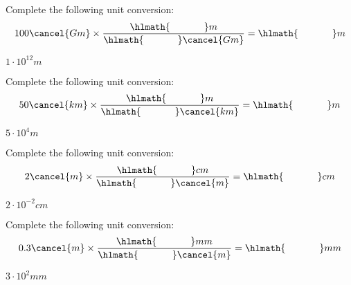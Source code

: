 \documentclass[main.tex]{subfiles}
\begin{document}
\begin{multicols*}{2}
\begin{question}[ID=17]
Complete the following unit conversion:
\[100\cancel{ Gm} \times \dfrac{ \hlmath{\hspace{35pt}}  m}{\hlmath{\hspace{35pt}} \cancel{ Gm}}= \hlmath{\hspace{35pt}}   m\]
\end{question}
\begin{solution}
$1\cdot 10^{12}m$
\hspace{0.1cm}\end{solution}%

\begin{question}[ID=\the\value{numA}]
Complete the following unit conversion:
\[50\cancel{ km} \times \dfrac{ \hlmath{\hspace{35pt}}  m}{\hlmath{\hspace{35pt}} \cancel{ km}}= \hlmath{\hspace{35pt}}   m\]
\end{question}
\begin{solution}
$5\cdot 10^{4}m$
\hspace{0.1cm}\end{solution}%



\begin{question}[ID=\the\value{numA}]
Complete the following unit conversion:
\[2\cancel{ m} \times \dfrac{ \hlmath{\hspace{35pt}}  cm}{\hlmath{\hspace{35pt}} \cancel{ m}}= \hlmath{\hspace{35pt}}   cm\]
\end{question}
\begin{solution}
$2\cdot 10^{-2}cm$
\hspace{0.1cm}\end{solution}%


\begin{question}[ID=\the\value{numA}]
Complete the following unit conversion:
\[0.3\cancel{ m} \times \dfrac{ \hlmath{\hspace{35pt}}  mm}{\hlmath{\hspace{35pt}} \cancel{ m}}= \hlmath{\hspace{35pt}}   mm\]
\end{question}
\begin{solution}
$3\cdot 10^{2}mm$
\hspace{0.1cm}\end{solution}%




\end{multicols*}
\end{document}
